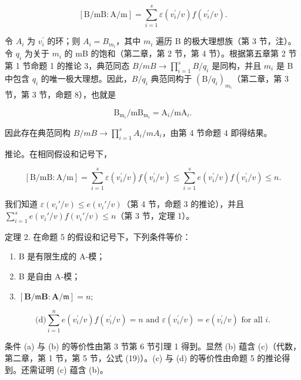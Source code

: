 \[
[ \mathrm{B} / \mathrm{mB}: \mathrm{A} / \mathrm{m} ] = \sum_ {i = 1} ^ {s} \varepsilon (v _ {i} ^ {\prime} / v) f (v _ {i} ^ {\prime} / v).
\]

令 \(A_{i}\) 为 \(v_{i}^{\prime}\) 的环；则 \(A_{i} = B_{m_{i}}\)，其中 \(m_{i}\) 遍历 B 的极大理想族（第 3 节，注）。令 \(q_{i}\) 为关于 \(m_{i}\) 的 mB 的饱和（第二章，第 2 节，第 4 节）。根据第五章第 2 节第 1 节命题 1 的推论 3，典范同态 \(B/mB \rightarrow \prod_{i=1}^{s} B/q_i\) 是同构，并且 \(m_i\) 是 B 中包含 \(q_i\) 的唯一极大理想。因此，\(B/q_i\) 典范同构于 \((\mathrm{B}/q_i)_{m_i}\)（第二章，第 3 节，第 3 节，命题 8），也就是

\[
\mathrm{B} _ {\mathrm{m} _ {i}} / \mathrm{mB} _ {\mathrm{m} _ {i}} = \mathrm{A} _ {i} / \mathrm{mA} _ {i}.
\]

因此存在典范同构 \(B/mB \rightarrow \prod_{i=1}^{s} A_{i}/mA_{i}\)，由第 4 节命题 4 即得结果。

推论。在相同假设和记号下，

\[
[ \mathrm{B} / \mathrm{mB}: \mathrm{A} / \mathrm{m} ] = \sum_ {i = 1} ^ {s} \varepsilon (v _ {i} ^ {\prime} / v) f (v _ {i} ^ {\prime} / v) \leqslant \sum_ {i = 1} ^ {s} e (v _ {i} ^ {\prime} / v) f (v _ {i} ^ {\prime} / v) \leqslant n.
\]

我们知道 \(\varepsilon(v_i'/v) \leqslant e(v_i'/v)\)（第 4 节，命题 3 的推论），并且 \(\sum_{i=1}^{s} e(v_i'/v)f(v_i'/v) \leqslant n\)（第 3 节，定理 1）。

定理 2. 在命题 5 的假设和记号下，下列条件等价：

\begin{enumerate}
\def\labelenumi{(\alph{enumi})}
\item
  B 是有限生成的 A-模；
\item
  B 是自由 A-模；
\item
  \([\mathbf{B} / \mathfrak{m}\mathbf{B}\colon \mathbf{A} / \mathfrak{m}] = n;\)
\end{enumerate}

\[
\text {(d)} \sum_ {i = 1} ^ {n} e (v _ {i} ^ {\prime} / v) f (v _ {i} ^ {\prime} / v) = n \text { and } \varepsilon (v _ {i} ^ {\prime} / v) = e (v _ {i} ^ {\prime} / v) \text { for   all } i.
\]

条件 (a) 与 (b) 的等价性由第 3 节第 6 节引理 1 得到。显然 (b) 蕴含 (c)（代数，第二章，第 1 节，第 5 节，公式 (19)）。(c) 与 (d) 的等价性由命题 5 的推论得到。还需证明 (c) 蕴含 (b)。

